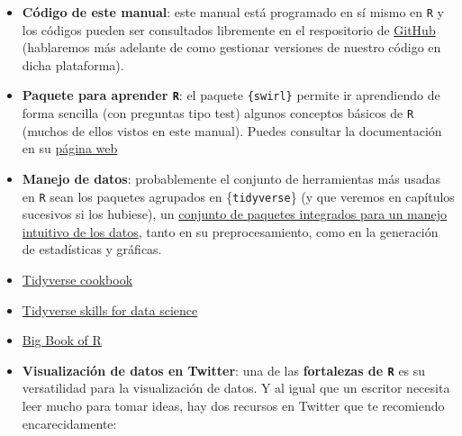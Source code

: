 \documentclass[11pt,]{book}
\begin{document}
\begin{itemize}
\item
  \textbf{Código de este manual}: este manual está programado en sí mismo en \texttt{R} y los códigos pueden ser consultados libremente en el respositorio de \href{https://github.com/dadosdelaplace/docencia}{GitHub} (hablaremos más adelante de como gestionar versiones de nuestro código en dicha plataforma).
\item
  \textbf{Paquete para aprender \texttt{R}}: el paquete \texttt{\{swirl\}} permite ir aprendiendo de forma sencilla (con preguntas tipo test) algunos conceptos básicos de \texttt{R} (muchos de ellos vistos en este manual). Puedes consultar la documentación en su \href{https://swirlstats.com/}{página web}
\item
  \textbf{Manejo de datos}: probablemente el conjunto de herramientas más usadas en \texttt{R} sean los paquetes agrupados en \{\texttt{tidyverse}\} (y que veremos en capítulos sucesivos si los hubiese), un \href{https://www.tidyverse.org/}{conjunto de paquetes integrados para un manejo intuitivo de los datos}, tanto en su preprocesamiento, como en la generación de estadísticas y gráficas.
\item
  \href{https://rstudio-education.github.io/tidyverse-cookbook/}{Tidyverse cookbook}
\item
  \href{https://jhudatascience.org/tidyversecourse/}{Tidyverse skills for data science}
\item
  \href{https://www.bigbookofr.com/index.html}{Big Book of R}
\item
  \textbf{Visualización de datos en Twitter}: una de las \textbf{fortalezas de \texttt{R}} es su versatilidad para la visualización de datos. Y al igual que un escritor necesita leer mucho para tomar ideas, hay dos recursos en Twitter que te recomiendo encarecidamente:


\end{itemize}
\end{document}
